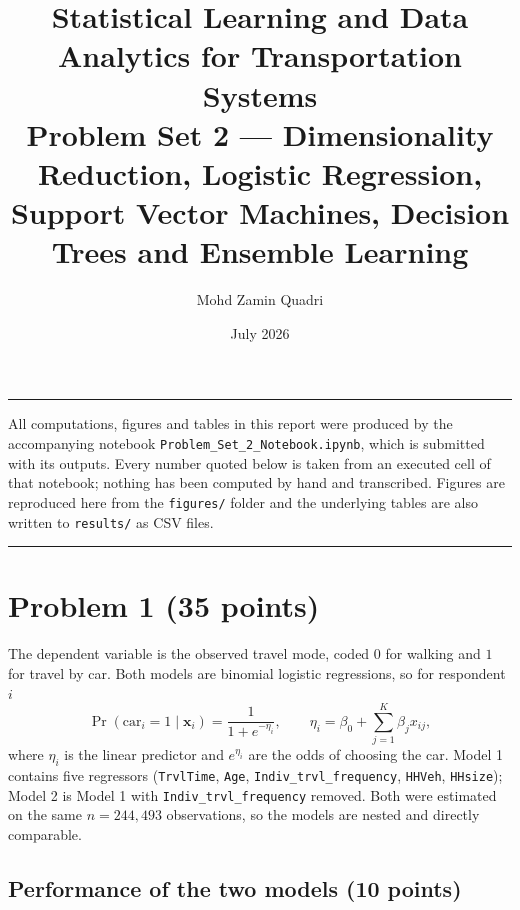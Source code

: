 \documentclass[11pt,a4paper]{article}
\title{\vspace{-1.5cm}Statistical Learning and Data Analytics for Transportation Systems\\[0.3em]
\large Problem Set 2 --- Dimensionality Reduction, Logistic Regression,\\
Support Vector Machines, Decision Trees and Ensemble Learning}
\author{Mohd Zamin Quadri}
\date{July 2026}
\newcommand{\code}[1]{\texttt{#1}}
\begin{document}
\maketitle

\vspace{-0.8em}
\noindent\rule{\textwidth}{0.4pt}

All computations, figures and tables in this report were produced by the accompanying
notebook \code{Problem\_Set\_2\_Notebook.ipynb}, which is submitted with its outputs. Every
number quoted below is taken from an executed cell of that notebook; nothing has been
computed by hand and transcribed. Figures are reproduced here from the \code{figures/}
folder and the underlying tables are also written to \code{results/} as CSV files.

\vspace{0.3em}
\noindent\rule{\textwidth}{0.4pt}

\section{Problem 1 (35 points)}

The dependent variable is the observed travel mode, coded $0$ for walking and $1$ for
travel by car. Both models are binomial logistic regressions, so for respondent $i$
\begin{equation}
\Pr(\text{car}_i = 1 \mid \mathbf{x}_i) = \frac{1}{1 + e^{-\eta_i}},
\qquad
\eta_i = \beta_0 + \sum_{j=1}^{K}\beta_j x_{ij},
\label{eq:logit}
\end{equation}
where $\eta_i$ is the linear predictor and $e^{\eta_i}$ are the odds of choosing the car.
Model 1 contains five regressors (\code{TrvlTime}, \code{Age},
\code{Indiv\_trvl\_frequency}, \code{HHVeh}, \code{HHsize}); Model 2 is Model 1 with
\code{Indiv\_trvl\_frequency} removed. Both were estimated on the same $n = 244{,}493$
observations, so the models are nested and directly comparable.

\subsection{Performance of the two models (10 points)}
\end{document}
